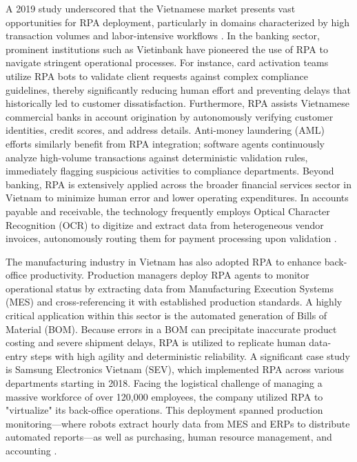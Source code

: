 A 2019 study underscored that the Vietnamese market presents vast opportunities for RPA deployment, particularly in domains characterized by high transaction volumes and labor-intensive workflows \parencite{chuong2019rpa}. In the banking sector, prominent institutions such as Vietinbank have pioneered the use of RPA to navigate stringent operational processes. For instance, card activation teams utilize RPA bots to validate client requests against complex compliance guidelines, thereby significantly reducing human effort and preventing delays that historically led to customer dissatisfaction. Furthermore, RPA assists Vietnamese commercial banks in account origination by autonomously verifying customer identities, credit scores, and address details. Anti-money laundering (AML) efforts similarly benefit from RPA integration; software agents continuously analyze high-volume transactions against deterministic validation rules, immediately flagging suspicious activities to compliance departments. Beyond banking, RPA is extensively applied across the broader financial services sector in Vietnam to minimize human error and lower operating expenditures. In accounts payable and receivable, the technology frequently employs Optical Character Recognition (OCR) to digitize and extract data from heterogeneous vendor invoices, autonomously routing them for payment processing upon validation \parencite{peng2022digital}.

The manufacturing industry in Vietnam has also adopted RPA to enhance back-office productivity. Production managers deploy RPA agents to monitor operational status by extracting data from Manufacturing Execution Systems (MES) and cross-referencing it with established production standards. A highly critical application within this sector is the automated generation of Bills of Material (BOM). Because errors in a BOM can precipitate inaccurate product costing and severe shipment delays, RPA is utilized to replicate human data-entry steps with high agility and deterministic reliability. A significant case study is Samsung Electronics Vietnam (SEV), which implemented RPA across various departments starting in 2018. Facing the logistical challenge of managing a massive workforce of over 120,000 employees, the company utilized RPA to "virtualize" its back-office operations. This deployment spanned production monitoring—where robots extract hourly data from MES and ERPs to distribute automated reports—as well as purchasing, human resource management, and accounting \parencite{chuong2019rpa}.

